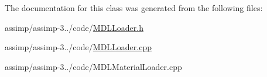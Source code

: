 The documentation for this class was generated from the following files\+:\begin{DoxyCompactItemize}
\item 
assimp/assimp-\/3../code/\hyperlink{_m_d_l_loader_8h}{M\+D\+L\+Loader.\+h}\item 
assimp/assimp-\/3../code/\hyperlink{_m_d_l_loader_8cpp}{M\+D\+L\+Loader.\+cpp}\item 
assimp/assimp-\/3../code/M\+D\+L\+Material\+Loader.\+cpp\end{DoxyCompactItemize}

